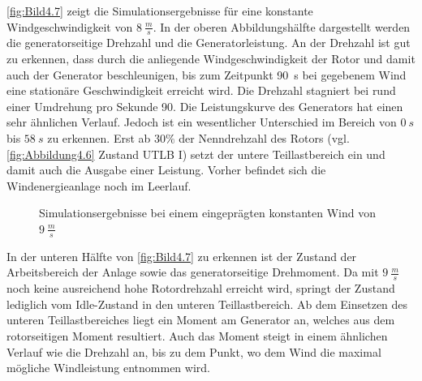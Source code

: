 \autoref{fig:Bild4.7} zeigt die Simulationsergebnisse für eine konstante Windgeschwindigkeit von $\SI{8}{\frac{m}{s}}$. In der oberen Abbildungshälfte dargestellt werden die generatorseitige Drehzahl und die Generatorleistung. An der Drehzahl ist gut zu erkennen, dass durch die anliegende Windgeschwindigkeit der Rotor und damit auch der Generator beschleunigen, bis \ca zum Zeitpunkt \SI{90}{s} bei gegebenem Wind eine stationäre Geschwindigkeit erreicht wird. Die Drehzahl stagniert bei rund einer Umdrehung pro Sekunde \bzw \SI{90}{}. Die Leistungskurve des Generators hat einen sehr ähnlichen Verlauf. Jedoch ist ein wesentlicher Unterschied im Bereich von $\SI{0}{s}$ bis $\SI{58}{s}$ zu erkennen. Erst ab $30\%$ der Nenndrehzahl des Rotors (vgl.\xspace \autoref{fig:Abbildung4.6} Zustand UTLB $\mathrm{I}$) setzt der untere Teillastbereich ein und damit auch die Ausgabe einer Leistung. Vorher befindet sich die Windenergieanlage noch im Leerlauf.

\begin{figure}[H]
   \centering
   \caption[Simulationsergebnisse langsamer konstanter Wind]{Simulationsergebnisse bei einem eingeprägten konstanten Wind von $\SI{9}{\frac{m}{s}}$}
   \label{fig:Bild4.7}
\end{figure}

In der unteren Hälfte von \autoref{fig:Bild4.7} zu erkennen ist der Zustand \bzw der Arbeitsbereich der Anlage sowie das generatorseitige Drehmoment. Da mit $\SI{9}{\frac{m}{s}}$ noch keine ausreichend hohe Rotordrehzahl erreicht wird, springt der Zustand lediglich vom Idle-Zustand in den unteren Teillastbereich. Ab dem Einsetzen des unteren Teillastbereiches liegt ein Moment am Generator an, welches aus dem rotorseitigen Moment resultiert. Auch das Moment steigt in einem ähnlichen Verlauf wie die Drehzahl an, bis zu dem Punkt, wo dem Wind die maximal mögliche Windleistung entnommen wird.\\


